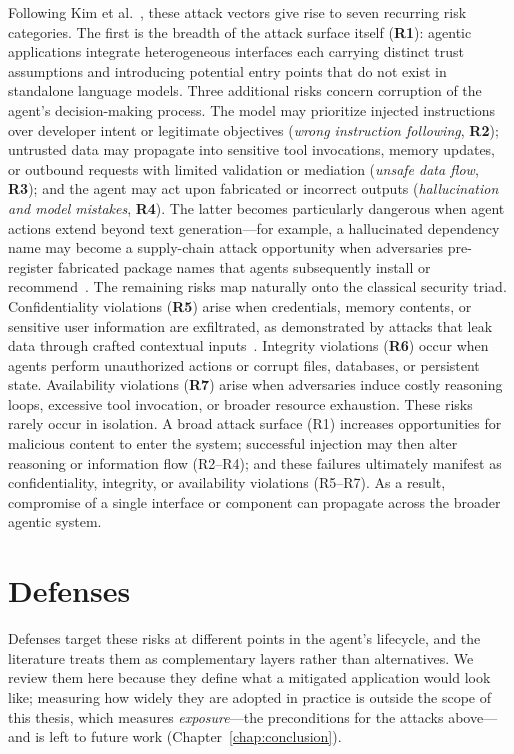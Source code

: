 Following Kim et al.~\cite{kim2026sok}, these attack vectors give rise to seven recurring risk categories. The first is the breadth of the attack surface itself (\textbf{R1}): agentic applications integrate heterogeneous interfaces each carrying distinct trust assumptions and introducing potential entry points that do not exist in standalone language models.
Three additional risks concern corruption of the agent's decision-making process. The model may prioritize injected instructions over developer intent or legitimate objectives (\emph{wrong instruction following}, \textbf{R2}); untrusted data may propagate into sensitive tool invocations, memory updates, or outbound requests with limited validation or mediation (\emph{unsafe data flow}, \textbf{R3}); and the agent may act upon fabricated or incorrect outputs (\emph{hallucination and model mistakes}, \textbf{R4}). The latter becomes particularly dangerous when agent actions extend beyond text generation—for example, a hallucinated dependency name may become a supply-chain attack opportunity when adversaries pre-register fabricated package names that agents subsequently install or recommend~\cite{spracklen}.
The remaining risks map naturally onto the classical security triad. Confidentiality violations (\textbf{R5}) arise when credentials, memory contents, or sensitive user information are exfiltrated, as demonstrated by attacks that leak data through crafted contextual inputs~\cite{echoleak}. Integrity violations (\textbf{R6}) occur when agents perform unauthorized actions or corrupt files, databases, or persistent state. Availability violations (\textbf{R7}) arise when adversaries induce costly reasoning loops, excessive tool invocation, or broader resource exhaustion.
These risks rarely occur in isolation. A broad attack surface (R1) increases opportunities for malicious content to enter the system; successful injection may then alter reasoning or information flow (R2--R4); and these failures ultimately manifest as confidentiality, integrity, or availability violations (R5--R7). As a result, compromise of a single interface or component can propagate across the broader agentic system.

\section{Defenses}

Defenses target these risks at different points in the agent's lifecycle, and the literature treats them as complementary layers rather than alternatives. We review them here because they define what a mitigated application would look like; measuring how widely they are adopted in practice is outside the scope of this thesis, which measures \emph{exposure}---the preconditions for the attacks above---and is left to future work (Chapter~\ref{chap:conclusion}).

